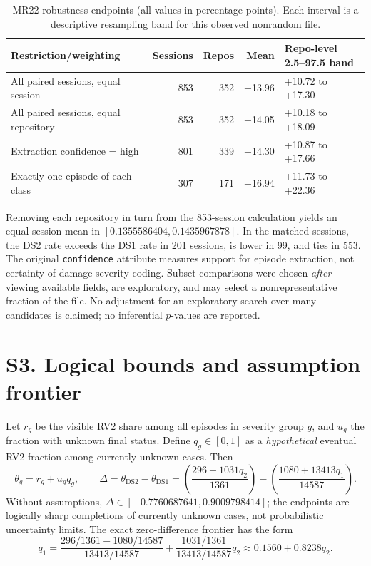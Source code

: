 \documentclass[10pt,a4paper]{article}
\begin{document}
\begin{table}[h!]
\centering\small
\caption{MR22 robustness endpoints (all values in percentage points). Each interval is a descriptive resampling band for this observed nonrandom file.}
\begin{tabularx}{\linewidth}{@{}YrrrY@{}}
\toprule
Restriction/weighting & Sessions & Repos & Mean & Repo-level 2.5--97.5 band\\\midrule
All paired sessions, equal session & 853 & 352 & +13.96 & +10.72 to +17.30\\
All paired sessions, equal repository & 853 & 352 & +14.05 & +10.18 to +18.09\\
Extraction confidence = high & 801 & 339 & +14.30 & +10.87 to +17.66\\
Exactly one episode of each class & 307 & 171 & +16.94 & +11.73 to +22.36\\
\bottomrule
\end{tabularx}
\end{table}

Removing each repository in turn from the 853-session calculation yields an equal-session mean in $[0.1355586404,0.1435967878]$. In the matched sessions, the DS2 rate exceeds the DS1 rate in 201 sessions, is lower in 99, and ties in 553. The original \texttt{confidence} attribute measures support for episode extraction, not certainty of damage-severity coding. Subset comparisons were chosen \emph{after} viewing available fields, are exploratory, and may select a nonrepresentative fraction of the file. No adjustment for an exploratory search over many candidates is claimed; no inferential $p$-values are reported.

\section*{S3. Logical bounds and assumption frontier}
Let $r_g$ be the visible RV2 share among all episodes in severity group $g$, and $u_g$ the fraction with unknown final status. Define $q_g\in[0,1]$ as a \emph{hypothetical} eventual RV2 fraction among currently unknown cases. Then
\[
\theta_g=r_g+u_gq_g,\qquad
\Delta=\theta_{\mathrm{DS2}}-\theta_{\mathrm{DS1}}=
\left(\frac{296+1031q_2}{1361}\right)-\left(\frac{1080+13413q_1}{14587}\right).
\]
Without assumptions, $\Delta\in[-0.7760687641,0.9009798414]$; the endpoints are logically sharp completions of currently unknown cases, not probabilistic uncertainty limits. The exact zero-difference frontier has the form
\[
q_1=\frac{296/1361-1080/14587}{13413/14587}+\frac{1031/1361}{13413/14587}q_2\approx0.1560+0.8238q_2.
\]
\end{document}
